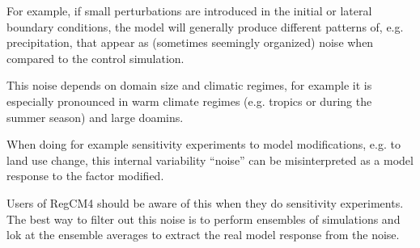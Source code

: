 For example, if small perturbations are introduced in the initial or lateral
boundary conditions, the model will generally produce different patterns of,
e.g. precipitation, that appear as (sometimes seemingly organized) noise when
compared to the control simulation.

This noise depends on domain size and climatic regimes, for example it is
especially pronounced in warm climate regimes (e.g. tropics or during the
summer season) and large doamins.

When doing for example sensitivity experiments to model modifications, e.g. to
land use change, this internal variability “noise” can be misinterpreted as a
model response to the factor modified.

Users of RegCM4 should be aware of this when they do sensitivity experiments.
The best way to filter out this noise is to perform ensembles of simulations
and lok at the ensemble averages to extract the real model response from the
noise.

